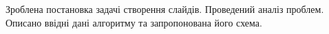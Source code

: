 \chapterConclusion

Зроблена постановка задачі створення слайдів. Проведений аналіз 
проблем. Описано ввідні дані алгоритму та запропонована 
його схема.